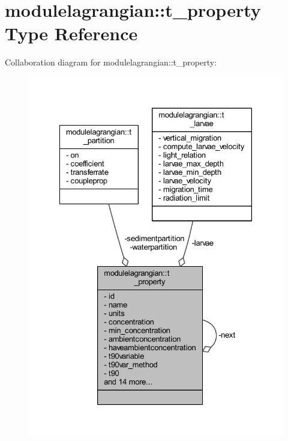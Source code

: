 \hypertarget{structmodulelagrangian_1_1t__property}{}\section{modulelagrangian\+:\+:t\+\_\+property Type Reference}
\label{structmodulelagrangian_1_1t__property}


Collaboration diagram for modulelagrangian\+:\+:t\+\_\+property\+:\nopagebreak
\begin{figure}[H]
\begin{center}
\leavevmode
\includegraphics[width=328pt]{structmodulelagrangian_1_1t__property__coll__graph}
\end{center}
\end{figure}
